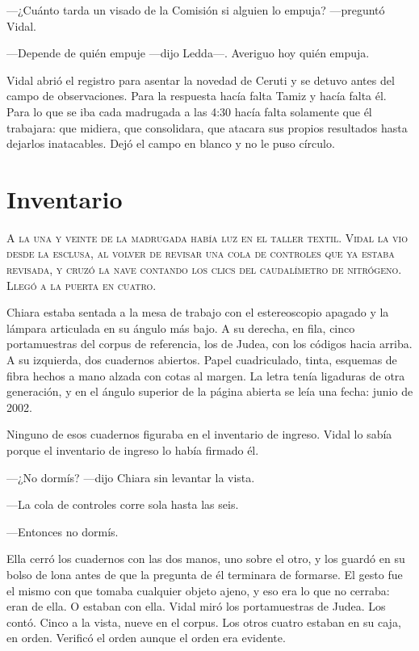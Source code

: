 ---¿Cuánto tarda un visado de la Comisión si alguien lo empuja? ---preguntó Vidal.

---Depende de quién empuje ---dijo Ledda---. Averiguo hoy quién empuja.

Vidal abrió el registro para asentar la novedad de Ceruti y se detuvo antes del campo de observaciones. Para la respuesta hacía falta Tamiz y hacía falta él. Para lo que se iba cada madrugada a las 4:30 hacía falta solamente que él trabajara: que midiera, que consolidara, que atacara sus propios resultados hasta dejarlos inatacables. Dejó el campo en blanco y no le puso círculo.

\clearpage

\chapter{Inventario}

\lettrine[lines=2, lhang=0.1, nindent=0.2em]{A}{ la una y veinte de la madrugada había luz en el taller textil. Vidal la vio desde la esclusa, al volver de revisar una cola de controles que ya estaba revisada, y cruzó la nave contando los clics del caudalímetro de nitrógeno. Llegó a la puerta en cuatro.}


Chiara estaba sentada a la mesa de trabajo con el estereoscopio apagado y la lámpara articulada en su ángulo más bajo. A su derecha, en fila, cinco portamuestras del corpus de referencia, los de Judea, con los códigos hacia arriba. A su izquierda, dos cuadernos abiertos. Papel cuadriculado, tinta, esquemas de fibra hechos a mano alzada con cotas al margen. La letra tenía ligaduras de otra generación, y en el ángulo superior de la página abierta se leía una fecha: junio de 2002.

Ninguno de esos cuadernos figuraba en el inventario de ingreso. Vidal lo sabía porque el inventario de ingreso lo había firmado él.

---¿No dormís? ---dijo Chiara sin levantar la vista.

---La cola de controles corre sola hasta las seis.

---Entonces no dormís.

Ella cerró los cuadernos con las dos manos, uno sobre el otro, y los guardó en su bolso de lona antes de que la pregunta de él terminara de formarse. El gesto fue el mismo con que tomaba cualquier objeto ajeno, y eso era lo que no cerraba: eran de ella. O estaban con ella. Vidal miró los portamuestras de Judea. Los contó. Cinco a la vista, nueve en el corpus. Los otros cuatro estaban en su caja, en orden. Verificó el orden aunque el orden era evidente.

